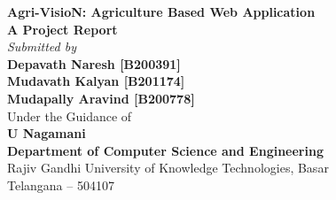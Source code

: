 \documentclass[12pt,a4paper]{report}
\begin{document}
\begin{titlepage}
    \begin{center}
        \vspace*{1in}
        \Huge \textbf{Agri-VisioN: Agriculture Based Web Application}\\[1.5cm]
        \Large \textbf{A Project Report}\\[0.5cm]
        \textit{Submitted by}\\[0.5cm]
        \textbf{Depavath Naresh [B200391]}\\
        \textbf{Mudavath Kalyan [B201174]}\\
        \textbf{Mudapally Aravind [B200778]}\\[1.5cm]
        Under the Guidance of\\[0.5cm]
        \textbf{U Nagamani}\\[0.5cm]
        \textbf{Department of Computer Science and Engineering}\\[0.5cm]
        Rajiv Gandhi University of Knowledge Technologies, Basar\\
        Telangana – 504107\\[1.5cm]
    \end{center}
\end{titlepage}
\end{document}
